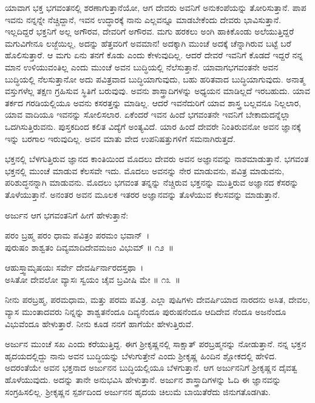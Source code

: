 ಯಾವಾಗ ಭಕ್ತ ಭಗವಂತನಲ್ಲಿ ಶರಣಾಗುತ್ತಾನೆಯೋ, ಆಗ ದೇವರು ಅವನಿಗೆ ಅನುಕಂಪೆಯನ್ನು ತೋರಿಸುತ್ತಾನೆ. ಪಾಪ ಇವನು ನನ್ನನ್ನೇ ನೆಚ್ಚಿದ್ದಾನೆ, ಇವನ ಉದ್ಧಾರಕ್ಕೆ ನಾನು ಎಲ್ಲವನ್ನೂ ಮಾಡಬೇಕೆಂದು ದೇವರು ಭಾವಿಸುತ್ತಾನೆ. ಇಲ್ಲದಿದ್ದರೆ ಭಕ್ತನಿಗೆ ಅಲ್ಲ ಅಗೌರವ, ದೇವರಿಗೆ ಅಗೌರವ. ಮಗು ಹರಕಲು ಅಂಗಿ ಹಾಕಿಕೊಂಡು ಅಲೆಯುತ್ತಿದ್ದರೆ ಮಗುವಿಗೇನೂ ಲಜ್ಜೆಯಿಲ್ಲ, ಅದನ್ನು ಹೆತ್ತವರಿಗೆ ಅವಮಾನ! ಅದಕ್ಕಾಗಿ ಮುಂಚೆ ಅದಕ್ಕೆ ಚೆನ್ನಾಗಿರುವ ಬಟ್ಟೆ ಬರೆ ಹೊಲಿಸುತ್ತಾರೆ. ಆ ಮಗು ಏನು ತನಗೆ ಕೊಡು ಎಂದು ಕೇಳುವುದಿಲ್ಲ. ಆದರೆ ದೇವರೆ ಇವನಿಗೆ ಕೊಡದೆ ಇದ್ದರೆ ನನ್ನ ಮಾನ ಉಳಿಯುವಂತಿಲ್ಲ ಎಂದು ಮುಂಚೆ ಅವನ ಬುದ್ಧಿಯಲ್ಲಿ ನೆಲೆಸುತ್ತಾನೆ. ಯಾವಾಗ\break ಭಗವಂತನೇ ಅವನ ಬುದ್ಧಿಯಲ್ಲಿ ನೆಲಸುತ್ತಾನೋ ಅದು ಪವಿತ್ರವಾದ ಬುದ್ಧಿಯಾಗುವುದು, ಬಹು ಹರಿತವಾದ ಬುದ್ಧಿಯಾಗುವುದು. ಅನಾತ್ಮ ವಸ್ತುಗಳೆಲ್ಲ ತಕ್ಷಣ ಗ್ರಹಿಸುವ ಸ್ಥಿತಿಗೆ ಬರುವುವು. ಅವನು ಶಾಸ್ತ್ರಾದಿಗಳನ್ನು ಅಧ್ಯಯನ ಮಾಡಿಲ್ಲದೆ ಇರಬಹುದು. ಯಾವ ತರ್ಕದ ಗರಡಿ\-ಯಲ್ಲಿಯೂ ಅವನು ಕಸರತ್ತನ್ನು ಮಾಡಿಲ್ಲ. ಆದರೆ ಇವನೆದುರಿಗೆ ಯಾವ ಶಾಸ್ತ್ರ ಬಲ್ಲವನೂ ನಿಲ್ಲಲಾರ, ಯಾವ ವಾದಿಯೂ ಇವನನ್ನು ಸೋಲಿಸಲಾರ. ಏಕೆಂದರೆ ಇವನ ಹಿಂದೆ ಭಗವಂತನೇ ಇವನಿಗೆ ಬೇಕಾದುದನ್ನೆಲ್ಲಾ ಒದಗಿಸುತ್ತಿರುವನು. ಪುಸ್ತಕದಿಂದ ಕಲಿತ ವಿದ್ಯೆಗೆ ಅಂತ್ಯವಿದೆ. ಯಾರ ಹಿಂದೆ ದೇವರೇ ನಿಂತಿರುವನೋ ಅವನ ಜ್ಞಾನಕ್ಕೆ ಇನ್ನು ಬರಗಾಲ ಇರುವುದಿಲ್ಲ. ಅವನ ಮಾತು ವೇದ ಉಪನಿಷತ್ತುಗಳಿಗೆ ಸಮನಾಗಿರುತ್ತದೆ.

ಭಕ್ತನಲ್ಲಿ ಬೆಳಗುತ್ತಿರುವ ಜ್ಞಾನದ ಕಾಂತಿಯಿಂದ ಮೊದಲು ದೇವರು ಅವನ ಅಜ್ಞಾನವನ್ನು ನಾಶಮಾಡುತ್ತಾನೆ. ಭಗವಂತ ಭಕ್ತನಲ್ಲಿ ಮುಂಚೆ ಮಾಡುವ ಕೆಲಸವೇ ಇದು. ಮೊದಲು ಅವನನ್ನು ನೇರ ಮಾಡುವನು, ಪವಿತ್ರ ಮಾಡುವನು, ಪರಿಶುದ್ಧನನ್ನಾಗಿ ಮಾಡುವನು. ಮೊದಲು ಭಗವಂತ ತನ್ನನ್ನು ನೆಚ್ಚಿರುವ ಭಕ್ತನನ್ನು ಮುತ್ತಿರುವ ಅಜ್ಞಾನದ ಕೆಸರನ್ನು ತೊಳೆಯುತ್ತಾನೆ. ಅನಂತರ ಅವನ ಮೂಲಕ ಇತರರ ಅಜ್ಞಾನವನ್ನು ತೊಳೆಯುವ ಕೆಲಸವನ್ನು ಮಾಡುತ್ತಾನೆ.

ಅರ್ಜುನ ಆಗ ಭಗವಂತನಿಗೆ ಹೀಗೆ ಹೇಳುತ್ತಾನೆ:

\begin{shloka}
ಪರಂ ಬ್ರಹ್ಮ ಪರಂ ಧಾಮ ಪವಿತ್ರಂ ಪರಮಂ ಭವಾನ್~।\\ಪುರುಷಂ ಶಾಶ್ವತಂ ದಿವ್ಯಮಾದಿದೇವಮಜಂ ವಿಭುಮ್ \hfill॥ ೧೨~॥
\end{shloka}

\begin{shloka}
ಆಹುಸ್ತ್ವಾಮೃಷಯಃ ಸರ್ವೇ ದೇವರ್ಷಿರ್ನಾರದಸ್ತಥಾ~।\\ಅಸಿತೋ ದೇವಲೋ ವ್ಯಾಸಃ ಸ್ವಯಂ ಚೈವ ಬ್ರವೀಷಿ ಮೇ \hfill॥ ೧೩~॥
\end{shloka}

\begin{artha}
ನೀನು ಪರಬ್ರಹ್ಮ, ಪರಮಧಾಮ, ಮತ್ತು ಪರಮ ಪವಿತ್ರ. ಎಲ್ಲಾ ಪುಷಿಗಳು ದೇವರ್ಷಿಯಾದ ನಾರದನು ಅಸಿತ, ದೇವಲ, ವ್ಯಾಸ ಮುಂತಾದವರು ನಿನ್ನನ್ನು ಶಾಶ್ವತನೆಂದೂ ದಿವ್ಯನೆಂದೂ ಪುರುಷನೆಂದೂ ಆದಿದೇವ ನೆಂದೂ ಅಜನೆಂದೂ ವಿಭುವೆಂದೂ ಹೇಳುತ್ತಾರೆ. ನೀನು ಕೂಡ ನನಗೆ ಹಾಗೆಯೇ ಹೇಳುತ್ತಿರುವೆ. 
\end{artha}

ಅರ್ಜುನ ಮುಂಚೆ ಸಖ ಎಂದು ಕರೆಯುತ್ತಿದ್ದ. ಈಗ ಶ‍್ರೀಕೃಷ್ಣನಲ್ಲಿ ಸಾಕ್ಷಾತ್ ಪರಬ್ರಹ್ಮನನ್ನು ನೋಡುತ್ತಾನೆ. ನನ್ನ ಭಕ್ತನ ಹೃದಯದಲ್ಲಿದ್ದು ನಾನು ಅವನ ಬುದ್ಧಿಯನ್ನು ಬೆಳುಗುತ್ತೇನೆ ಎಂದು ಶ‍್ರೀಕೃಷ್ಣ ಹಿಂದಿನ ಶ್ಲೋಕದಲ್ಲಿ ಹೇಳಿದ. ಅದರಂತೆಯೇ ಅವನ ಭಕ್ತನಾದ ಅರ್ಜುನನ ಬುದ್ಧಿಯಲ್ಲಿಯೂ ಬೆಳಗುತ್ತಾನೆ. ಆಗ ಅರ್ಜುನನಿಗೆ ಶ‍್ರೀಕೃಷ್ಣನ ದೈವತ್ವ ಹೊಳೆಯುವುದು. ಅದನ್ನು ತಾನೇ ಅನುಭವಿಸಿ ಹೇಳುತ್ತಾನೆ. ಅರ್ಜುನ ಶಾಸ್ತ್ರಾದಿಗಳನ್ನು ಓದಿ ಈ ಜ್ಞಾನವನ್ನು ಸಂಗ್ರಹಿಸಲಿಲ್ಲ. ಶ‍್ರೀಕೃಷ್ಣನ ಸ್ಪರ್ಶದಿಂದ ಅರ್ಜುನನ ಹೃದಯ ಚಿಲುಮೆ ಬಾಯಿತೆರೆದು ಜಿನುಗತೊಡಗಿತು.

